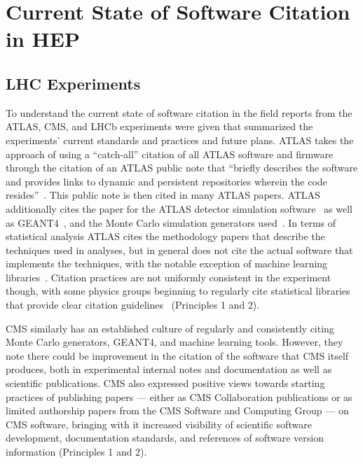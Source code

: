 \section{Current State of Software Citation in HEP}\label{sec:current_state}

\subsection{LHC Experiments}\label{sec:lhc_experiments}

To understand the current state of software citation in the field reports from the ATLAS, CMS, and LHCb experiments were given that summarized the experiments' current standards and practices and future plans.
ATLAS takes the approach of using a ``catch-all'' citation of all ATLAS software and firmware through the citation of an ATLAS public note that ``briefly describes the software and provides links to dynamic and persistent repositories wherein the code resides''~\cite{ATL-SOFT-PUB-2021-001}.
This public note is then cited in many ATLAS papers.
ATLAS additionally cites the paper for the ATLAS detector simulation software~\cite{SOFT-2010-01} as well as GEANT4~\cite{GEANT4:2002zbu}, and the Monte Carlo simulation generators used~\cite{Sjostrand:2007gs,Sjostrand:2014zea,Alwall:2014hca,Sherpa:2019gpd}.
In terms of statistical analysis ATLAS cites the methodology papers that describe the techniques used in analyses, but in general does not cite the actual software that implements the techniques, with the notable exception of machine learning libraries~\cite{chollet2015keras,tensorflow2015-whitepaper}.
Citation practices are not uniformly consistent in the experiment though, with some physics groups beginning to regularly cite statistical libraries that provide clear citation guidelines~\cite{pyhf,pyhf_joss} (Principles 1 and 2).

CMS similarly has an established culture of regularly and consistently citing Monte Carlo generators, GEANT4, and machine learning tools.
However, they note there could be improvement in the citation of the software that CMS itself produces, both in experimental internal notes and documentation as well as scientific publications.
CMS also expressed positive views towards starting practices of publishing papers --- either as CMS Collaboration publications or as limited authorship papers from the CMS Software and Computing Group --- on CMS software, bringing with it increased visibility of scientific software development, documentation standards, and references of software version information (Principles 1 and 2).

